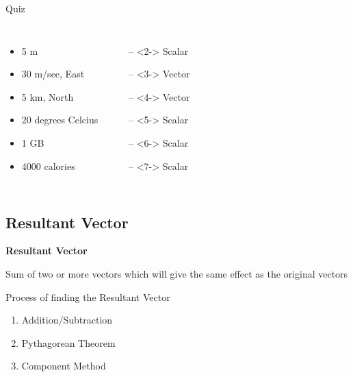 \documentclass[aspectratio=169]{beamer}
\begin{document}
\begin{frame}{Quiz}
		
		\begin{columns}
			\begin{itemize}
				\item 5 m
				\item 30 m/sec, East
				\item 5 km, North
				\item 20 degrees Celcius
				\item 1 GB
				\item 4000 calories
			\end{itemize}
			\begin{itemize}
				\item[--]<2-> Scalar
				\item[--]<3-> Vector
				\item[--]<4-> Vector
				\item[--]<5-> Scalar
				\item[--]<6-> Scalar
				\item[--]<7-> Scalar
			\end{itemize}
		\end{columns}
\end{frame}

\subsection{Resultant Vector}

\begin{frame}
	\textbf{Resultant Vector}
	\begin{definition}
		Sum of two or more vectors which will give the same effect as the original vectors
	\end{definition}
\end{frame}


\begin{frame}{Process of finding the Resultant Vector}
	
	\begin{enumerate}
		\item Addition/Subtraction
		\item Pythagorean Theorem
		\item Component Method
	\end{enumerate}
	
\end{frame}
\end{document}
